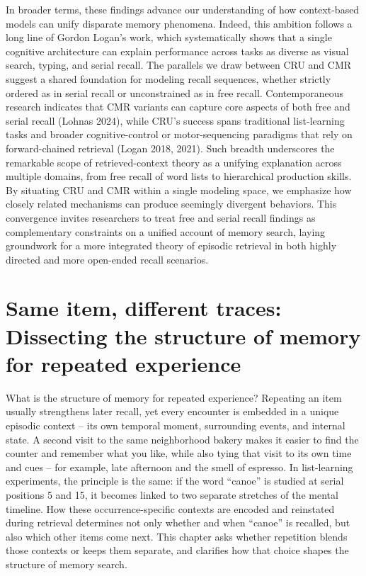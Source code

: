 \documentclass[
  letterpaper,
  11pt,
  english,
  singlespacing,
  headsepline]{MastersDoctoralThesis}
\begin{document}
In broader terms, these findings advance our understanding of how
context-based models can unify disparate memory phenomena. Indeed, this
ambition follows a long line of Gordon Logan's work, which
systematically shows that a single cognitive architecture can explain
performance across tasks as diverse as visual search, typing, and serial
recall. The parallels we draw between CRU and CMR suggest a shared
foundation for modeling recall sequences, whether strictly ordered as in
serial recall or unconstrained as in free recall. Contemporaneous
research indicates that CMR variants can capture core aspects of both
free and serial recall (Lohnas 2024), while CRU's success spans
traditional list-learning tasks and broader cognitive-control or
motor-sequencing paradigms that rely on forward-chained retrieval (Logan
2018, 2021). Such breadth underscores the remarkable scope of
retrieved-context theory as a unifying explanation across multiple
domains, from free recall of word lists to hierarchical production
skills. By situating CRU and CMR within a single modeling space, we
emphasize how closely related mechanisms can produce seemingly divergent
behaviors. This convergence invites researchers to treat free and serial
recall findings as complementary constraints on a unified account of
memory search, laying groundwork for a more integrated theory of
episodic retrieval in both highly directed and more open-ended recall
scenarios.


\chapter{Same item, different traces: Dissecting the structure of memory
for repeated
experience}\label{same-item-different-traces-dissecting-the-structure-of-memory-for-repeated-experience}

What is the structure of memory for repeated experience? Repeating an
item usually strengthens later recall, yet every encounter is embedded
in a unique episodic context -- its own temporal moment, surrounding
events, and internal state. A second visit to the same neighborhood
bakery makes it easier to find the counter and remember what you like,
while also tying that visit to its own time and cues -- for example,
late afternoon and the smell of espresso. In list-learning experiments,
the principle is the same: if the word ``canoe'' is studied at serial
positions 5 and 15, it becomes linked to two separate stretches of the
mental timeline. How these occurrence-specific contexts are encoded and
reinstated during retrieval determines not only whether and when
``canoe'' is recalled, but also which other items come next. This
chapter asks whether repetition blends those contexts or keeps them
separate, and clarifies how that choice shapes the structure of memory
search.
\end{document}
